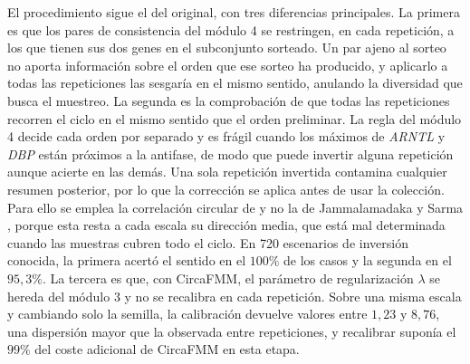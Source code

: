 \documentclass[12pt, a4paper]{report}
\begin{document}
El procedimiento sigue el del original, con tres diferencias principales. La primera es que los pares de consistencia del módulo 4 se restringen, en cada repetición, a los que tienen sus dos genes en el subconjunto sorteado. Un par ajeno al sorteo no aporta información sobre el orden que ese sorteo ha producido, y aplicarlo a todas las repeticiones las sesgaría en el mismo sentido, anulando la diversidad que busca el muestreo. La segunda es la comprobación de que todas las repeticiones recorren el ciclo en el mismo sentido que el orden preliminar. La regla del módulo 4 decide cada orden por separado y es frágil cuando los máximos de \textit{ARNTL} y \textit{DBP} están próximos a la antifase, de modo que puede invertir alguna repetición aunque acierte en las demás. Una sola repetición invertida contamina cualquier resumen posterior, por lo que la corrección se aplica antes de usar la colección. Para ello se emplea la correlación circular de \citet{fisherlee1983} y no la de Jammalamadaka y Sarma \citep{jammalamadaka2001}, porque esta resta a cada escala su dirección media, que está mal determinada cuando las muestras cubren todo el ciclo. En 720 escenarios de inversión conocida, la primera acertó el sentido en el \(100\%\) de los casos y la segunda en el \(95{,}3\%\). La tercera es que, con CircaFMM, el parámetro de regularización \(\lambda\) se hereda del módulo 3 y no se recalibra en cada repetición. Sobre una misma escala y cambiando solo la semilla, la calibración devuelve valores entre \(1{,}23\) y \(8{,}76\), una dispersión mayor que la observada entre repeticiones, y recalibrar suponía el \(99\%\) del coste adicional de CircaFMM en esta etapa.
\end{document}
